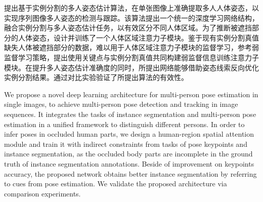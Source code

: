 \begin{cabstractextra}
    提出基于实例分割的多人姿态估计算法，在单张图像上准确提取多人人体姿态，以实现序列图像多人姿态的检测与跟踪。该算法提出一个统一的深度学习网络结构，融合实例分割与多人姿态估计任务，以有效区分不同人体区域。为了推断被遮挡部分的人体姿态，设计并训练了一个人体区域注意力子模块。鉴于现有实例分割真值缺失人体被遮挡部分的数据，难以用于人体区域注意力子模块的监督学习，参考弱监督学习策略，提出使用关键点与实例分割真值共同构建弱监督信息训练注意力子模块。在提升多人姿态估计准确度的同时，所提出网络能够借助姿态线索反向优化实例分割结果。通过对比实验验证了所提出算法的有效性。
\end{cabstractextra}
\begin{eabstractextra}
    We propose a novel deep learning architecture for multi-person pose estimation in single images, to achieve multi-person pose detection and tracking in image sequences. It integrates the tasks of instance segmentation and multi-person pose estimation in a unified framework to distinguish different persons. In order to infer poses in occluded human parts, we design a human-region spatial attention module and train it with indirect constraints from tasks of pose keypoints and instance segmentation, as the occluded body parts are incomplete in the ground truth of instance segmentation annotations. Beside of improvement on keypoints accuracy, the proposed network obtains better instance segmentation by referring to cues from pose estimation. We validate the proposed architecture via comparison experiments.
\end{eabstractextra}
